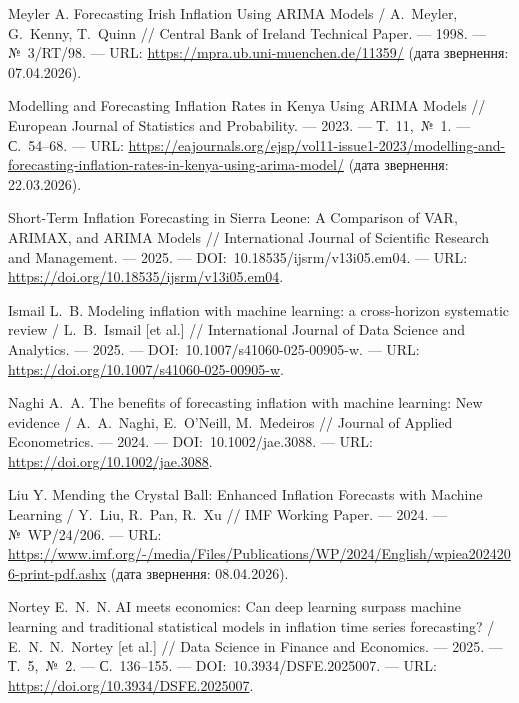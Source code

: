 \documentclass{bachelor_thesis}
\begin{document}
\begin{enumerate}[label={[\arabic*]}, leftmargin=0pt, itemindent=0pt, labelindent=0pt]
\item Meyler A. Forecasting Irish Inflation Using ARIMA Models / A.~Meyler, G.~Kenny, T.~Quinn // Central Bank of Ireland Technical Paper. --- 1998. --- №~3/RT/98. --- URL: \url{https://mpra.ub.uni-muenchen.de/11359/} (дата звернення: 07.04.2026).

\item Modelling and Forecasting Inflation Rates in Kenya Using ARIMA Models // European Journal of Statistics and Probability. --- 2023. --- Т.~11,~№~1. --- С.~54--68. --- URL: \url{https://eajournals.org/ejsp/vol11-issue1-2023/modelling-and-forecasting-inflation-rates-in-kenya-using-arima-model/} (дата звернення: 22.03.2026).

\item Short-Term Inflation Forecasting in Sierra Leone: A Comparison of VAR, ARIMAX, and ARIMA Models // International Journal of Scientific Research and Management. --- 2025. --- DOI:~10.18535/ijsrm/v13i05.em04. --- URL: \url{https://doi.org/10.18535/ijsrm/v13i05.em04}.

\item Ismail L.~B. Modeling inflation with machine learning: a cross-horizon systematic review / L.~B.~Ismail [et al.] // International Journal of Data Science and Analytics. --- 2025. --- DOI:~10.1007/s41060-025-00905-w. --- URL: \url{https://doi.org/10.1007/s41060-025-00905-w}.

\item Naghi A.~A. The benefits of forecasting inflation with machine learning: New evidence / A.~A.~Naghi, E.~O'Neill, M.~Medeiros // Journal of Applied Econometrics. --- 2024. --- DOI:~10.1002/jae.3088. --- URL: \url{https://doi.org/10.1002/jae.3088}.

\item Liu Y. Mending the Crystal Ball: Enhanced Inflation Forecasts with Machine Learning / Y.~Liu, R.~Pan, R.~Xu // IMF Working Paper. --- 2024. --- №~WP/24/206. --- URL: \url{https://www.imf.org/-/media/Files/Publications/WP/2024/English/wpiea2024206-print-pdf.ashx} (дата звернення: 08.04.2026).

\item Nortey E.~N.~N. AI meets economics: Can deep learning surpass machine learning and traditional statistical models in inflation time series forecasting? / E.~N.~N.~Nortey [et al.] // Data Science in Finance and Economics. --- 2025. --- Т.~5,~№~2. --- С.~136--155. --- DOI:~10.3934/DSFE.2025007. --- URL: \url{https://doi.org/10.3934/DSFE.2025007}.


\end{enumerate}
\end{document}
